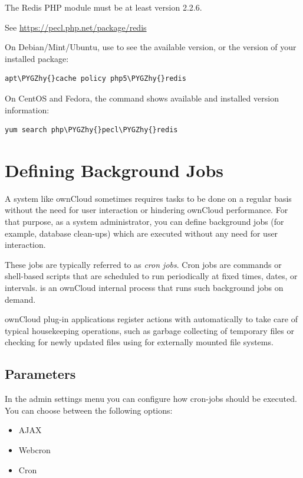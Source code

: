 \documentclass[letterpaper,10pt,english]{sphinxmanual}
\def\PYGZhy{\char`\-}
\begin{document}
The Redis PHP module must be at least version 2.2.6.

See \href{https://pecl.php.net/package/redis}{https://pecl.php.net/package/redis}

On Debian/Mint/Ubuntu, use  to see the available
 version, or the version of your installed package:

\begin{Verbatim}[commandchars=\\\{\}]
apt\PYGZhy{}cache policy php5\PYGZhy{}redis
\end{Verbatim}

On CentOS and Fedora, the  command shows available and installed version
information:

\begin{Verbatim}[commandchars=\\\{\}]
yum search php\PYGZhy{}pecl\PYGZhy{}redis
\end{Verbatim}


\section{Defining Background Jobs}
\label{configuration_server/background_jobs_configuration:defining-background-jobs}\label{configuration_server/background_jobs_configuration::doc}
A system like ownCloud sometimes requires tasks to be done on a regular basis without the need for user interaction or hindering ownCloud performance. For that purpose, as a system administrator, you can define background jobs (for example, database clean-ups) which are executed without any need for user interaction.

These jobs are typically referred to as \emph{cron jobs}.  Cron jobs are commands or shell-based scripts that are scheduled to run periodically at fixed times, dates, or intervals.    is an ownCloud internal process that runs such background jobs on demand.

ownCloud plug-in applications register actions with  automatically to take care of typical housekeeping operations, such as garbage collecting of temporary files or checking for newly updated files using  for externally mounted file systems.


\subsection{Parameters}
\label{configuration_server/background_jobs_configuration:parameters}
In the admin settings menu you can configure how cron-jobs should be executed.
You can choose between the following options:
\begin{itemize}
\item {} 
AJAX

\item {} 
Webcron

\item {} 
Cron

\end{itemize}
\end{document}
